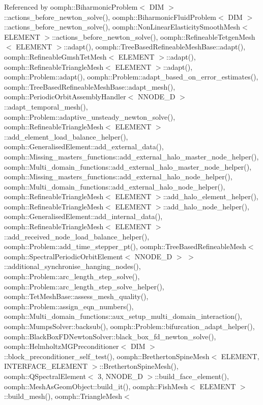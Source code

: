 Referenced by oomph\+::\+Biharmonic\+Problem$<$ D\+I\+M $>$\+::actions\+\_\+before\+\_\+newton\+\_\+solve(), oomph\+::\+Biharmonic\+Fluid\+Problem$<$ D\+I\+M $>$\+::actions\+\_\+before\+\_\+newton\+\_\+solve(), oomph\+::\+Non\+Linear\+Elasticity\+Smooth\+Mesh$<$ E\+L\+E\+M\+E\+N\+T $>$\+::actions\+\_\+before\+\_\+newton\+\_\+solve(), oomph\+::\+Refineable\+Tetgen\+Mesh$<$ E\+L\+E\+M\+E\+N\+T $>$\+::adapt(), oomph\+::\+Tree\+Based\+Refineable\+Mesh\+Base\+::adapt(), oomph\+::\+Refineable\+Gmsh\+Tet\+Mesh$<$ E\+L\+E\+M\+E\+N\+T $>$\+::adapt(), oomph\+::\+Refineable\+Triangle\+Mesh$<$ E\+L\+E\+M\+E\+N\+T $>$\+::adapt(), oomph\+::\+Problem\+::adapt(), oomph\+::\+Problem\+::adapt\+\_\+based\+\_\+on\+\_\+error\+\_\+estimates(), oomph\+::\+Tree\+Based\+Refineable\+Mesh\+Base\+::adapt\+\_\+mesh(), oomph\+::\+Periodic\+Orbit\+Assembly\+Handler$<$ N\+N\+O\+D\+E\+\_\+D $>$\+::adapt\+\_\+temporal\+\_\+mesh(), oomph\+::\+Problem\+::adaptive\+\_\+unsteady\+\_\+newton\+\_\+solve(), oomph\+::\+Refineable\+Triangle\+Mesh$<$ E\+L\+E\+M\+E\+N\+T $>$\+::add\+\_\+element\+\_\+load\+\_\+balance\+\_\+helper(), oomph\+::\+Generalised\+Element\+::add\+\_\+external\+\_\+data(), oomph\+::\+Missing\+\_\+masters\+\_\+functions\+::add\+\_\+external\+\_\+halo\+\_\+master\+\_\+node\+\_\+helper(), oomph\+::\+Multi\+\_\+domain\+\_\+functions\+::add\+\_\+external\+\_\+halo\+\_\+master\+\_\+node\+\_\+helper(), oomph\+::\+Missing\+\_\+masters\+\_\+functions\+::add\+\_\+external\+\_\+halo\+\_\+node\+\_\+helper(), oomph\+::\+Multi\+\_\+domain\+\_\+functions\+::add\+\_\+external\+\_\+halo\+\_\+node\+\_\+helper(), oomph\+::\+Refineable\+Triangle\+Mesh$<$ E\+L\+E\+M\+E\+N\+T $>$\+::add\+\_\+halo\+\_\+element\+\_\+helper(), oomph\+::\+Refineable\+Triangle\+Mesh$<$ E\+L\+E\+M\+E\+N\+T $>$\+::add\+\_\+halo\+\_\+node\+\_\+helper(), oomph\+::\+Generalised\+Element\+::add\+\_\+internal\+\_\+data(), oomph\+::\+Refineable\+Triangle\+Mesh$<$ E\+L\+E\+M\+E\+N\+T $>$\+::add\+\_\+received\+\_\+node\+\_\+load\+\_\+balance\+\_\+helper(), oomph\+::\+Problem\+::add\+\_\+time\+\_\+stepper\+\_\+pt(), oomph\+::\+Tree\+Based\+Refineable\+Mesh$<$ oomph\+::\+Spectral\+Periodic\+Orbit\+Element$<$ N\+N\+O\+D\+E\+\_\+D $>$ $>$\+::additional\+\_\+synchronise\+\_\+hanging\+\_\+nodes(), oomph\+::\+Problem\+::arc\+\_\+length\+\_\+step\+\_\+solve(), oomph\+::\+Problem\+::arc\+\_\+length\+\_\+step\+\_\+solve\+\_\+helper(), oomph\+::\+Tet\+Mesh\+Base\+::assess\+\_\+mesh\+\_\+quality(), oomph\+::\+Problem\+::assign\+\_\+eqn\+\_\+numbers(), oomph\+::\+Multi\+\_\+domain\+\_\+functions\+::aux\+\_\+setup\+\_\+multi\+\_\+domain\+\_\+interaction(), oomph\+::\+Mumps\+Solver\+::backsub(), oomph\+::\+Problem\+::bifurcation\+\_\+adapt\+\_\+helper(), oomph\+::\+Black\+Box\+F\+D\+Newton\+Solver\+::black\+\_\+box\+\_\+fd\+\_\+newton\+\_\+solve(), oomph\+::\+Helmholtz\+M\+G\+Preconditioner$<$ D\+I\+M $>$\+::block\+\_\+preconditioner\+\_\+self\+\_\+test(), oomph\+::\+Bretherton\+Spine\+Mesh$<$ E\+L\+E\+M\+E\+N\+T, I\+N\+T\+E\+R\+F\+A\+C\+E\+\_\+\+E\+L\+E\+M\+E\+N\+T $>$\+::\+Bretherton\+Spine\+Mesh(), oomph\+::\+Q\+Spectral\+Element$<$ 3, N\+N\+O\+D\+E\+\_\+D $>$\+::build\+\_\+face\+\_\+element(), oomph\+::\+Mesh\+As\+Geom\+Object\+::build\+\_\+it(), oomph\+::\+Fish\+Mesh$<$ E\+L\+E\+M\+E\+N\+T $>$\+::build\+\_\+mesh(), oomph\+::\+Triangle\+Mesh$<$ 